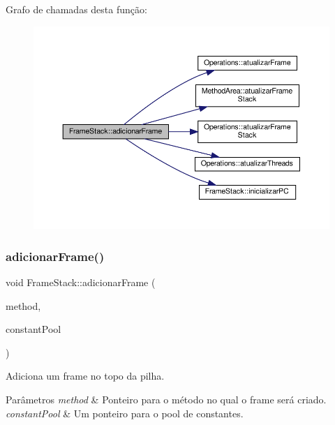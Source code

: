 Grafo de chamadas desta função\+:
\nopagebreak
\begin{figure}[H]
\begin{center}
\leavevmode
\includegraphics[width=350pt]{classFrameStack_aee31df6406a899bbf581eea9fc5545e6_cgraph}
\end{center}
\end{figure}
\mbox{\label{classFrameStack_a7bb4b64eece0c146fc647636397c572c}} 
\subsubsection{\texorpdfstring{adicionar\+Frame()}{adicionarFrame()}\hspace{0.1cm}{\footnotesize\ttfamily [2/2]}}
{\footnotesize\ttfamily void Frame\+Stack\+::adicionar\+Frame (\begin{DoxyParamCaption}\item[{\hyperlink{structmethod__info}{method\+\_\+info} $\ast$}]{method,  }\item[{\hyperlink{structcp__info}{cp\+\_\+info} $\ast$}]{constant\+Pool }\end{DoxyParamCaption})}



Adiciona um frame no topo da pilha. 


\begin{DoxyParams}{Parâmetros}
{\em method} & Ponteiro para o método no qual o frame será criado. \\
\hline
{\em constant\+Pool} & Um ponteiro para o pool de constantes. \\
\hline
\end{DoxyParams}


